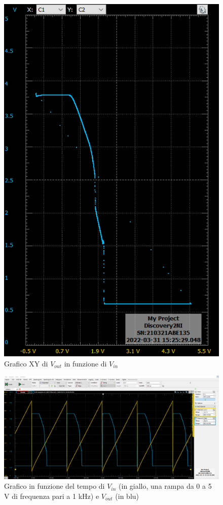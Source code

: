 \documentclass[10pt, a4paper, italian]{article}
\begin{document}
\begin{figure}
	\includegraphics[scale=0.4]{not_xy1}
	\caption{Grafico XY di $V_{out}$ in funzione di $V_{in}$}
\end{figure}
\begin{figure}
	\includegraphics[width=\textwidth]{not_time1}
	\caption{Grafico in funzione del tempo di $V_{in}$ (in giallo, una rampa da 0 a 5 V di frequenza pari a 1 kHz) e $V_{out}$ (in blu)}
\end{figure}
\end{document}

